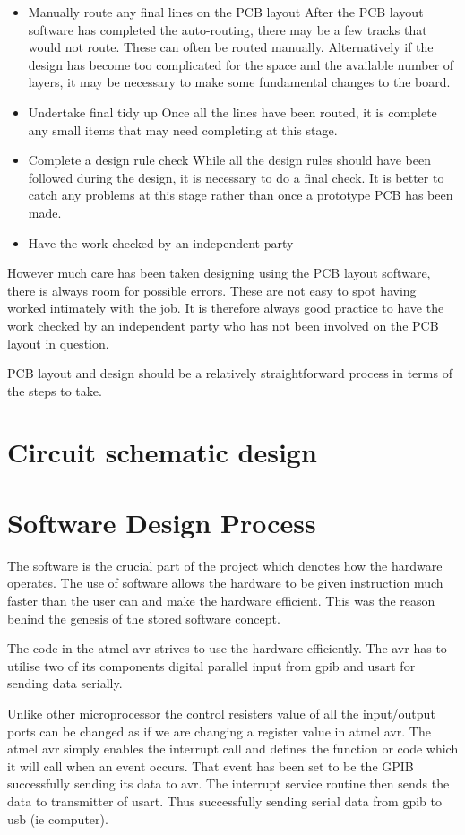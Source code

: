 \documentclass[12pt]{article}
\begin{document}
\begin{itemize}
\item	Manually route any final lines on the PCB layout  
After the PCB layout software has completed the auto-routing, there may be a few tracks that would not route. These can often be routed manually. Alternatively if the design has become too complicated for the space and the available number of layers, it may be necessary to make some fundamental changes to the board.
\item	Undertake final tidy up   
Once all the lines have been routed, it is complete any small items that may need completing at this stage.
\item	Complete a design rule check 
While all the design rules should have been followed during the design, it is necessary to do a final check. It is better to catch any problems at this stage rather than once a prototype PCB has been made.
\item	Have the work checked by an independent party  
\end{itemize}
However much care has been taken designing using the PCB layout software, there is always room for possible errors. These are not easy to spot having worked intimately with the job. It is therefore always good practice to have the work checked by an independent party who has not been involved on the PCB layout in question.

PCB layout and design should be a relatively straightforward process in terms of the steps to take. 
\newpage

\section{Circuit schematic design}

\section{Software Design Process}
The software is the crucial part of the project which denotes how the hardware operates. The use of software allows the hardware to be given instruction much faster than the user can and make the hardware efficient. This was the reason behind the genesis of the stored software concept.

The code in the atmel avr strives to use the hardware efficiently. The avr has to utilise two of its components digital parallel input from gpib and usart for sending data serially. 

Unlike other microprocessor the control resisters value of all the input/output ports can be changed as if we are changing a register value in atmel avr. The atmel avr simply enables the interrupt call and defines the function or code which it will call when an event occurs. That event has been set to be the GPIB successfully sending its data to avr.
The interrupt service routine then sends the data to transmitter of usart. Thus successfully sending serial data from gpib to usb (ie computer).
\end{document}
